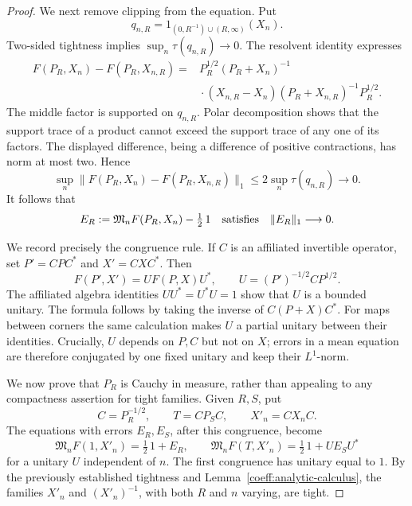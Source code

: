 \begin{proof}
We next remove clipping from the equation.  Put
\[
 q_{n,R}=1_{(0,R^{-1})\cup(R,\infty)}(X_n).
\]
Two-sided tightness implies \(\sup_n\tau(q_{n,R})\to0\).
The resolvent identity expresses
\begin{align*}
 F(P_R,X_n)-F(P_R,X_{n,R})
 ={}&P_R^{1/2}(P_R+X_n)^{-1}\\
 &{}\cdot(X_{n,R}-X_n)(P_R+X_{n,R})^{-1}P_R^{1/2}.
\end{align*}
The middle factor is supported on \(q_{n,R}\).  Polar decomposition
shows that the support trace of a product cannot exceed the support
trace of any one of its factors.  The displayed difference, being a
difference of positive contractions, has norm at most two.  Hence
\[
 \sup_n\|F(P_R,X_n)-F(P_R,X_{n,R})\|_1
       \le2\sup_n\tau(q_{n,R})\longrightarrow0.
\]
It follows that
\begin{equation}\label{coeff:analytic-approx-error}
 E_R:=\mathfrak M_nF(P_R,X_n)-\tfrac12\,1
       \quad\hbox{satisfies}\quad \|E_R\|_1\longrightarrow0.
\end{equation}

We record precisely the congruence rule.  If \(C\) is an affiliated
invertible operator, set \(P'=CPC^*\) and \(X'=CXC^*\).  Then
\begin{equation}\label{coeff:analytic-congruence}
 F(P',X')=U F(P,X)U^*,\qquad
 U=(P')^{-1/2}CP^{1/2}.
\end{equation}
The affiliated algebra identities \(UU^*=U^*U=1\) show that \(U\)
is a bounded unitary.  The formula follows by taking the inverse of
\(C(P+X)C^*\).  For maps between corners the same calculation makes
\(U\) a partial unitary between their identities.  Crucially, \(U\)
depends on \(P,C\) but not on \(X\); errors in a mean equation are
therefore conjugated by one fixed unitary and keep their \(L^1\)-norm.

We now prove that \(P_R\) is Cauchy in measure, rather than appealing
to any compactness assertion for tight families.  Given \(R,S\), put
\[
 C=P_R^{-1/2},\qquad
 T=C P_S C,\qquad X'_n=C X_n C.
\]
The equations with errors \(E_R,E_S\), after this congruence, become
\[
 \mathfrak M_nF(1,X'_n)=\tfrac12\,1+E_R,\qquad
 \mathfrak M_nF(T,X'_n)=\tfrac12\,1+U E_SU^*
\]
for a unitary \(U\) independent of \(n\).  The first congruence has
unitary equal to \(1\).  By the previously established tightness and
Lemma~\ref{coeff:analytic-calculus}, the families \(X'_n\) and
\((X'_n)^{-1}\), with both \(R\) and \(n\) varying, are tight.


\end{proof}
